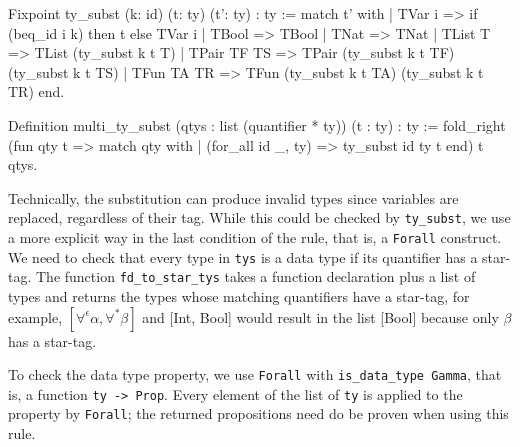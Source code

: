 \documentclass[paper = a4, fleqn, twoside]{scrreprt}
\newcommand{\coqinline}[1]{\texttt{#1}}
\begin{document}
\begin{coqcode}
Fixpoint ty_subst (k: id) (t: ty) (t': ty) : ty :=
  match t' with
  | TVar i      =>  if (beq_id i k) then t else TVar i
  | TBool       => TBool
  | TNat        => TNat
  | TList T     => TList (ty_subst k t T)
  | TPair TF TS => TPair (ty_subst k t TF) (ty_subst k t TS)
  | TFun  TA TR => TFun  (ty_subst k t TA) (ty_subst k t TR)
  end.
\end{coqcode}
\begin{coqcode}
Definition multi_ty_subst (qtys : list (quantifier * ty)) (t : ty) : ty := 
  fold_right (fun qty t => match qty with 
                           | (for_all id _, ty) => ty_subst id ty t
                           end)
              t qtys.
\end{coqcode}
Technically, the substitution can produce invalid types since variables are replaced, regardless of their tag. While this could be checked by \texttt{ty\_subst}, we use a more explicit way in the last condition of the rule, that is, a \coqinline{Forall} construct. We need to check that every type in \coqinline{tys} is a data type if its quantifier has a star-tag. The function \coqinline{fd_to_star_tys} takes a function declaration plus a list of types and returns the types whose matching quantifiers have a star-tag, for example, $[\forall^{\epsilon}\alpha, \forall^{*}\beta]$ and [Int, Bool] would result in the list [Bool] because only $\beta$ has a star-tag. 
\par
To check the data type property, we use \coqinline{Forall} with \coqinline{is_data_type Gamma}, that is, a function \coqinline{ty -> Prop}. Every element of the list of \texttt{ty} is applied to the property by \coqinline{Forall}; the returned propositions need do be proven when using this rule.
\end{document}
